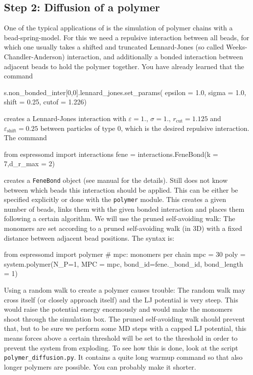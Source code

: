 \subsection{Step 2: Diffusion of a polymer}
One of the typical applications of \ES{} is the simulation of polymer chains 
with a bead-spring-model. For this we need a repulsive interaction
between all beads, for which one usually takes a shifted and truncated
Lennard-Jones (so called Weeks-Chandler-Anderson) interaction, 
and additionally a bonded interaction between 
adjacent beads to hold the polymer together. You have already learned
that the command
{\vspace{0,2cm}\small
\begin{pypresso}
  s.non\_bonded\_inter[0,0].lennard\_jones.set\_params(
      epsilon = 1.0, sigma = 1.0,
      shift = 0.25, cutof = 1.226)
\end{pypresso}\vspace{0,2cm}
}
creates a Lennard-Jones interaction with $\varepsilon=1.$, $\sigma=1.$,
$r_\text{cut} = 1.125$ and $\varepsilon_\text{shift}=0.25$ between particles
of type 0, which is the desired 
repulsive interaction. The command
{\vspace{0,2cm}\small
\begin{pypresso}
  from espressomd import interactions
  fene = interactions.FeneBond(k = 7,d\_r\_max = 2)
\end{pypresso}
\vspace{0,2cm}
}
creates a \texttt{FeneBond} object (see \ES{} manual for the details). Still \ES{}
does not know between which beads this interaction should be applied.
This can be either be specified explicitly or done with the \texttt{polymer}
module. This creates a given number of beads, links them with the given
bonded interaction and places them following a certain algorithm. We will
use the pruned self-avoiding walk: The monomers are set according 
to a pruned self-avoiding walk (in 3D) with a
fixed distance between adjacent bead positions. The syntax is:
{\vspace{0,2cm}\small
\begin{pypresso}
  from espressomd import polymer
  # mpc: monomers per chain
  mpc = 30
  poly = system.polymer(N\_P=1, MPC = mpc, bond\_id=fene.\_bond\_id,
                        bond\_length = 1)
\end{pypresso}
\vspace{0,2cm}
}
Using a random walk to create a polymer causes trouble: The random walk may 
cross itself (or closely approach itself) and the LJ potential is very
steep. This would raise the potential energy enormously and would make
the monomers shoot through the simulation box. The pruned self-avoiding
walk should prevent that, but to be sure
we perform some MD steps with a capped LJ potential, this means 
forces above a certain threshold will be set to the threshold in order to prevent
the system from exploding. To see how this is done, look at the script 
\texttt{polymer\_diffusion.py}.
It contains a quite long warmup command so that also longer polymers
are possible. You can probably make it shorter.

